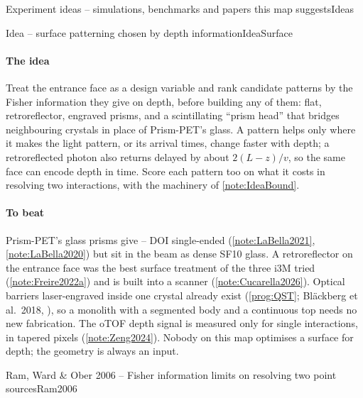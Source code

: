 \begin{programnote}{Experiment ideas -- simulations, benchmarks and papers this map suggests}{Ideas}
\begin{papernote}{Idea -- surface patterning chosen by depth information}{IdeaSurface}
\paragraph{The idea}
Treat the entrance face as a design variable and rank candidate patterns by the
Fisher information they give on depth, before building any of them: flat,
retroreflector, engraved prisms, and a scintillating ``prism head'' that
bridges neighbouring crystals in place of Prism-PET's glass. A pattern helps
only where it makes the light pattern, or its arrival times, change faster with
depth; a retroreflected photon also returns delayed by about $2(L-z)/v$, so the
same face can encode depth in time. Score each pattern too on what it costs in
resolving two interactions, with the machinery of \ref{note:IdeaBound}.

\paragraph{To beat}
Prism-PET's glass prisms give -- DOI single-ended
(\ref{note:LaBella2021}, \ref{note:LaBella2020}) but sit in the beam as dense
SF10 glass. A retroreflector on the entrance face was the best surface
treatment of the three i3M tried (\ref{note:Freire2022a}) and is built into a
scanner (\ref{note:Cucarella2026}). Optical barriers laser-engraved inside one
crystal already exist (\ref{prog:QST}; Bl\"ackberg et al.\ 2018,
\cite{Blackberg2018}), so a monolith with a segmented body and a continuous top
needs no new fabrication. The oTOF depth signal is measured only for single
interactions, in tapered pixels (\ref{note:Zeng2024}). Nobody on this map
optimises a surface for depth; the geometry is always an input.
\end{papernote}

\end{programnote}

\begin{papernote}{Ram, Ward \& Ober 2006 -- Fisher information limits on resolving two point sources}{Ram2006}
\end{papernote}
 
